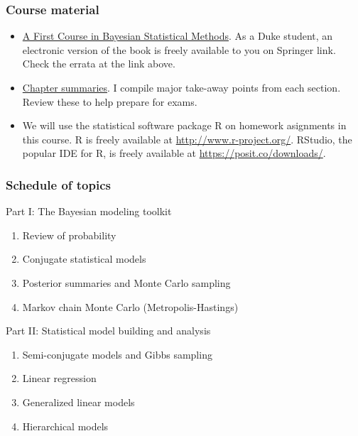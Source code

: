 \documentclass[
  letterpaper,
  DIV=11,
  numbers=noendperiod]{scrartcl}
\providecommand{\tightlist}{%
  \setlength{\itemsep}{0pt}\setlength{\parskip}{0pt}}\usepackage{longtable,booktabs,array}
\begin{document}
\subsubsection{Course material}\label{course-material}

\begin{itemize}
\item
  \href{https://pdhoff.github.io/book/}{A First Course in Bayesian
  Statistical Methods}. As a Duke student, an electronic version of the
  book is freely available to you on Springer link. Check the errata at
  the link above.
\item
  \href{./chapterSummaries.html}{Chapter summaries}. I compile major
  take-away points from each section. Review these to help prepare for
  exams.
\item
  We will use the statistical software package R on homework asignments
  in this course. R is freely available at
  \url{http://www.r-project.org/}. RStudio, the popular IDE for R, is
  freely available at \url{https://posit.co/downloads/}.
\end{itemize}

\subsubsection{Schedule of topics}\label{schedule-of-topics}

Part I: The Bayesian modeling toolkit

\begin{enumerate}
\def\labelenumi{\arabic{enumi}.}
\tightlist
\item
  Review of probability
\item
  Conjugate statistical models
\item
  Posterior summaries and Monte Carlo sampling
\item
  Markov chain Monte Carlo (Metropolis-Hastings)
\end{enumerate}

Part II: Statistical model building and analysis

\begin{enumerate}
\def\labelenumi{\arabic{enumi}.}
\tightlist
\item
  Semi-conjugate models and Gibbs sampling
\item
  Linear regression
\item
  Generalized linear models
\item
  Hierarchical models
\end{enumerate}
\end{document}
